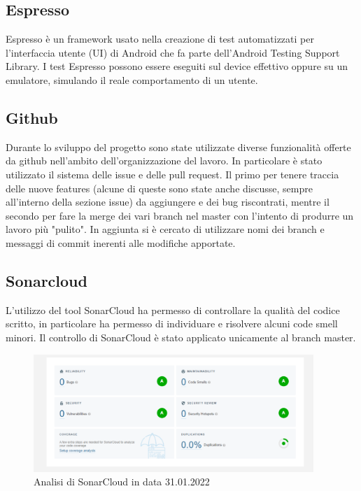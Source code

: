 \documentclass[12pt]{article}
\begin{document}
\subsection{Espresso}
Espresso è un framework usato nella creazione di test automatizzati per l'interfaccia utente (UI) di Android che fa parte dell'Android Testing Support Library.\newline
I test Espresso possono essere eseguiti sul device effettivo oppure su un emulatore, simulando il reale comportamento di un utente.


\subsection{Github}
Durante lo sviluppo del progetto sono state utilizzate diverse funzionalità offerte da github nell'ambito dell'organizzazione del lavoro. In particolare è stato utilizzato il sistema delle issue e delle pull request. Il primo per tenere traccia delle nuove features (alcune di queste sono state anche discusse, sempre all'interno della sezione issue) da aggiungere e dei bug riscontrati, mentre il secondo per fare la merge dei vari branch nel master con l'intento di produrre un lavoro più "pulito". In aggiunta si è cercato di utilizzare nomi dei branch e messaggi di commit inerenti alle modifiche apportate.


\subsection{Sonarcloud}
L'utilizzo del tool SonarCloud ha permesso di controllare la qualità del codice scritto, in particolare ha permesso di individuare e risolvere alcuni code smell minori.
Il controllo di SonarCloud è stato applicato unicamente al branch master.
\begin{figure}[H]
\centering
\includegraphics[width=400px]{sonarcloud.png}
\caption{\label{fig:sonarcloud}Analisi di SonarCloud in data 31.01.2022}
\end{figure}
\end{document}

